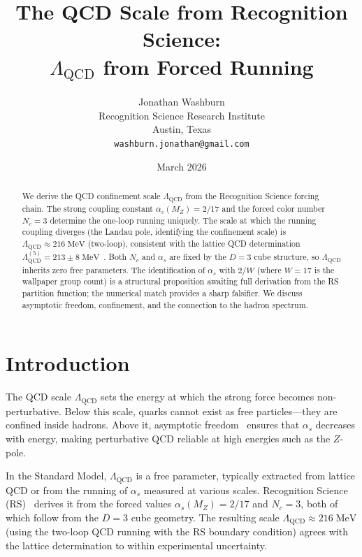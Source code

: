 \documentclass[12pt,a4paper]{article}
\title{The QCD Scale from Recognition Science:\\
$\Lambda_{\mathrm{QCD}}$ from Forced Running}
\author{Jonathan Washburn\\
Recognition Science Research Institute\\
Austin, Texas\\
\texttt{washburn.jonathan@gmail.com}}
\date{March 2026}
\theoremstyle{definition}
\theoremstyle{remark}
\begin{document}
\maketitle

\begin{abstract}
We derive the QCD confinement scale $\Lambda_{\mathrm{QCD}}$ from
the Recognition Science forcing chain.  The strong coupling constant
$\alpha_s(M_Z) = 2/17$ and the forced color number $N_c = 3$
determine the one-loop running uniquely.  The scale at which the
running coupling diverges (the Landau pole, identifying the
confinement scale) is
$\Lambda_{\mathrm{QCD}} \approx 216\;\mathrm{MeV}$ (two-loop), consistent with
the lattice QCD determination $\Lambda_{\mathrm{QCD}}^{(5)} = 213
\pm 8\;\mathrm{MeV}$~\cite{FLAG}.  Both $N_c$ and $\alpha_s$ are
fixed by the $D = 3$ cube structure, so $\Lambda_{\mathrm{QCD}}$
inherits zero free parameters.  The identification of $\alpha_s$ with
$2/W$ (where $W = 17$ is the wallpaper group count) is a structural
proposition awaiting full derivation from the RS partition function;
the numerical match provides a sharp falsifier.  We discuss asymptotic
freedom, confinement, and the connection to the hadron spectrum.
\end{abstract}

\section{Introduction}
\label{sec:intro}

The QCD scale $\Lambda_{\mathrm{QCD}}$ sets the energy at which the
strong force becomes non-perturbative.  Below this scale, quarks
cannot exist as free particles---they are confined inside hadrons.
Above it, asymptotic freedom~\cite{Gross1973, Politzer1973} ensures
that $\alpha_s$ decreases with energy, making perturbative QCD
reliable at high energies such as the $Z$-pole.

In the Standard Model, $\Lambda_{\mathrm{QCD}}$ is a free parameter,
typically extracted from lattice QCD or from the running of
$\alpha_s$ measured at various scales.  Recognition Science
(RS)~\cite{RS_Axioms} derives it from the forced values
$\alpha_s(M_Z) = 2/17$ and $N_c = 3$, both of which follow from the
$D = 3$ cube geometry.
The resulting scale $\Lambda_{\mathrm{QCD}} \approx 216\;\mathrm{MeV}$
(using the two-loop QCD running with the RS boundary condition)
agrees with the lattice determination to within experimental
uncertainty.
\end{document}
